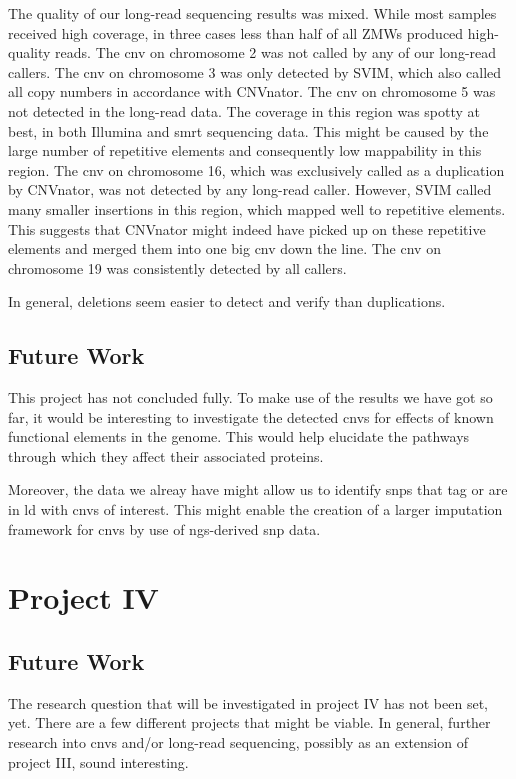 \documentclass[draft, twoside=false]{scrbook}
\begin{document}
The quality of our long-read sequencing results was mixed.
While most samples received high coverage, in three cases less than half of all ZMWs produced high-quality reads.
The \gls{cnv} on chromosome 2 was not called by any of our long-read callers.
The \gls{cnv} on chromosome 3 was only detected by \textsf{SVIM}, which also called all copy numbers in accordance with \textsf{CNVnator}.
The \gls{cnv} on chromosome 5 was not detected in the long-read data.
The coverage in this region was spotty at best, in both Illumina and \gls{smrt} sequencing data.
This might be caused by the large number of repetitive elements and consequently low mappability in this region.
The \gls{cnv} on chromosome 16, which was exclusively called as a duplication by \textsf{CNVnator}, was not detected by any long-read caller.
However, \textsf{SVIM} called many smaller insertions in this region, which mapped well to repetitive elements.
This suggests that \textsf{CNVnator} might indeed have picked up on these repetitive elements and merged them into one big \gls{cnv} down the line.
The \gls{cnv} on chromosome 19 was consistently detected by all callers.

In general, deletions seem easier to detect and verify than duplications.

\section{Future Work}
This project has not concluded fully.
To make use of the results we have got so far, it would be interesting to investigate the detected \glspl{cnv} for effects of known functional elements in the genome.
This would help elucidate the pathways through which they affect their associated proteins.

Moreover, the data we alreay have might allow us to identify \glspl{snp} that tag or are in \gls{ld} with \glspl{cnv} of interest.
This might enable the creation of a larger imputation framework for \glspl{cnv} by use of \gls{ngs}-derived \gls{snp} data.

\chapter{Project IV}
\section{Future Work}
The research question that will be investigated in project IV has not been set, yet.
There are a few different projects that might be viable.
In general, further research into \glspl{cnv} and/or long-read sequencing, possibly as an extension of project III, sound interesting.
\end{document}
